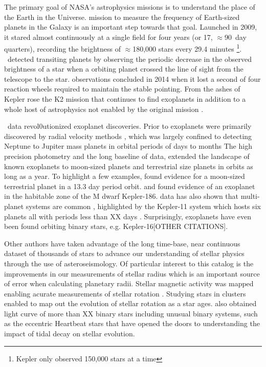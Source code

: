 
The primary goal of NASA's astrophysics missions is to understand the place of the Earth in the Universe.  mission to measure the frequency of Earth-sized planets in the Galaxy is an important step towards that goal. Launched in 2009, it stared almost continuously at a single field for four years (or 17, $\approx$90~day quarters), recording the brightness of $\approx$180,000 stars every 29.4 minutes \footnote{Kepler only observed 150,000 stars at a time}. \Kepler\ detected transiting planets by observing the periodic decrease in the observed brightness of a star when a orbiting planet crossed the line of sight from the telescope to the star.  observations concluded in 2014 when it lost a second of four reaction wheels required to maintain the stable pointing.  From the ashes of Kepler rose the K2 mission  that continues to find exoplanets in addition to a whole host of astrophysics not enabled by the original \Kepler{} mission \citep{Howell2014}.


\Kepler\ data revol0utionized exoplanet discoveries. Prior to \Kepler{,} exoplanets were primarily discovered by radial velocity methods \citep[e.g.][]{Queloz95}, which was largely confined to detecting Neptune to Jupiter mass planets in orbital periods of days to months The high precision photometry and the long baseline of  \Kepler{} data, extended the landscape of known exoplanets to moon-sized planets and terrestrial size planets in orbits as long as a year. To highlight a few examples, \citep{Barclay2013} found evidence for a moon-sized terrestrial planet in a 13.3 day period orbit. and \citep{Quintana2014} found evidence of an exoplanet in the habitable zone of the M dwarf Kepler-186. \Kepler data has also shown that multi-planet systems are common , highlighted by the Kepler-11 system which hosts six planets all with periods less than XX days \citep[XX][]{Lissauer2011}. Surprisingly,  exoplanets have even been found orbiting binary stars, e.g. Kepler-16\citep{Doyle2011}[OTHER CITATIONS].

Other authors have taken advantage of the long time-base, near continuous dataset of thousands of stars to advance our understanding of stellar physics through the use of asteroseismology. Of particular interest to this catalog is the improvements in our measurements of stellar radius \citep[e.g.][]{Huber14?} which is an important source of error when calculating planetary radii. Stellar magnetic activity was mapped enabling acurate measurements of stellar rotation \citep[e.g.][]{ThatgirlinOxford}. Studying stars in clusters enabled \citet{Meibom??} to map out the evolution of stellar rotation as a star ages. \Kepler{} also obtained light curve of more than XX binary stars \citep{Prsa2011,Kirk2016} including unusual binary systems, such as the eccentric Heartbeat stars \citet{Welsh2011,Thompson2012} that have opened the doors to understanding the impact of tidal decay on stellar evolution.

